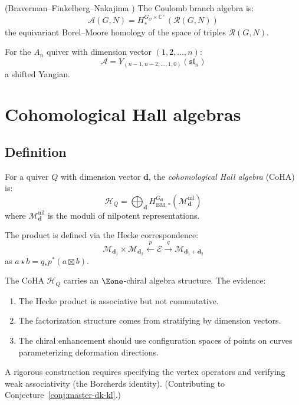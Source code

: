 \begin{theorem}\label{thm:bfn}
(Braverman--Finkelberg--Nakajima \cite{BFN18}) The Coulomb branch algebra is:
\[
\mathcal{A}(G, N) = H^{G_{\mathcal{O}} \times \mathbb{C}^\times}_*(\mathcal{R}(G, N))
\]
the equivariant Borel--Moore homology of the space of triples $\mathcal{R}(G, N)$.
\end{theorem}

\begin{example}\label{ex:coulomb-an}
For the $A_n$ quiver with dimension vector $(1, 2, \ldots, n)$:
\[
\mathcal{A} = Y_{(n-1, n-2, \ldots, 1, 0)}(\mathfrak{sl}_n)
\]
a shifted Yangian.
\end{example}


\section{Cohomological Hall algebras}
\label{sec:coha}

\subsection{Definition}

\begin{definition}\label{def:coha}
For a quiver $Q$ with dimension vector $\mathbf{d}$, the \emph{cohomological Hall algebra} (CoHA) is:
\[
\mathcal{H}_Q = \bigoplus_{\mathbf{d}} H^{G_{\mathbf{d}}}_{\mathrm{BM},*}(\mathcal{M}_{\mathbf{d}}^{\mathrm{nil}})
\]
where $\mathcal{M}_{\mathbf{d}}^{\mathrm{nil}}$ is the moduli of nilpotent representations.

The product is defined via the Hecke correspondence:
\[
\mathcal{M}_{\mathbf{d}_1} \times \mathcal{M}_{\mathbf{d}_2} \xleftarrow{p} \mathcal{E} \xrightarrow{q} \mathcal{M}_{\mathbf{d}_1 + \mathbf{d}_2}
\]
as $a \star b = q_* p^*(a \boxtimes b)$.
\end{definition}

\begin{conjecture}\label{conj:coha-e1}
The CoHA $\mathcal{H}_Q$ carries an $\Eone$-chiral algebra structure.  The evidence:
\begin{enumerate}[label=(\roman*)]
\item The Hecke product is associative but not commutative.
\item The factorization structure comes from stratifying by dimension vectors.
\item The chiral enhancement should use configuration spaces of points on curves
parameterizing deformation directions.
\end{enumerate}
A rigorous construction requires specifying the vertex operators and verifying
weak associativity (the Borcherds identity).
(Contributing to Conjecture~\ref{conj:master-dk-kl}.)
\end{conjecture}

